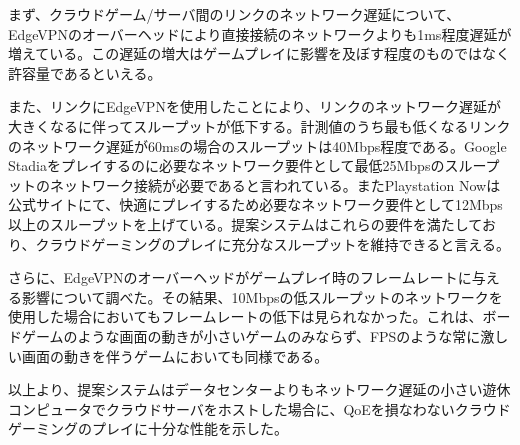 まず、クラウドゲーム/サーバ間のリンクのネットワーク遅延について、EdgeVPNのオーバーヘッドにより直接接続のネットワークよりも1ms程度遅延が増えている。この遅延の増大はゲームプレイに影響を及ぼす程度のものではなく許容量であるといえる。

また、リンクにEdgeVPNを使用したことにより、リンクのネットワーク遅延が大きくなるに伴ってスループットが低下する。計測値のうち最も低くなるリンクのネットワーク遅延が60msの場合のスループットは40Mbps程度である。Google Stadiaをプレイするのに必要なネットワーク要件として最低25Mbpsのスループットのネットワーク接続が必要であると言われている\cite{stadia_band}。またPlaystation Nowは公式サイトにて、快適にプレイするため必要なネットワーク要件として12Mbps以上のスループットを上げている\cite{ps-now}。提案システムはこれらの要件を満たしており、クラウドゲーミングのプレイに充分なスループットを維持できると言える。

さらに、EdgeVPNのオーバーヘッドがゲームプレイ時のフレームレートに与える影響について調べた。その結果、10Mbpsの低スループットのネットワークを使用した場合においてもフレームレートの低下は見られなかった。これは、ボードゲームのような画面の動きが小さいゲームのみならず、FPSのような常に激しい画面の動きを伴うゲームにおいても同様である。

以上より、提案システムはデータセンターよりもネットワーク遅延の小さい遊休コンピュータでクラウドサーバをホストした場合に、QoEを損なわないクラウドゲーミングのプレイに十分な性能を示した。




